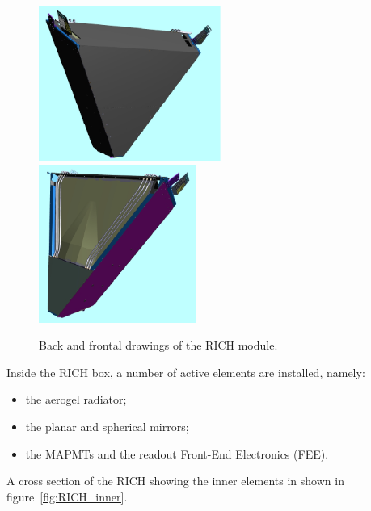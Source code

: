 \documentclass[12pt]{article}
\begin{document}
\begin{figure}[h!]
\center
\includegraphics[width=0.53\textwidth]{pics/Rich_frontal.jpg}
\includegraphics[width=0.46\textwidth]{pics/Rich_back.jpg}
\caption{ \label{fig:RICH_outer} Back and frontal drawings of the RICH module.}
\end{figure}

Inside the RICH box, a number of active elements are installed, namely:
\begin{itemize}
\item{the aerogel radiator;}
\item{the planar and spherical mirrors;}
\item{the MAPMTs and the readout Front-End Electronics (FEE).}
\end{itemize}

A cross section of the RICH showing the inner elements in shown in figure~\ref{fig:RICH_inner}.
\end{document}
